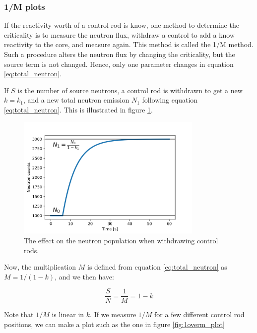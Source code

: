 \subsubsection{1/M plots}

If the reactivity worth of a control rod is know, one method to determine the criticality is to measure the neutron flux, withdraw a control to add a know reactivity to the core, and measure again. This method is called the 1/M method. Such a procedure alters the neutron flux by changing the criticality, but the source term is not changed. Hence, only one parameter changes in equation \ref{eq:total_neutron}.

If $S$ is the number of source neutrons, a control rod is withdrawn to get a new $k = k_1$, and a new total neutron emission $N_1$ following equation \ref{eq:total_neutron}. This is illustrated in figure \ref{fig:1overm}.

\begin{figure} 
\centering
\includegraphics[width=0.8\textwidth]{figures/04-1overM.png}
\caption[Area Method]{\label{fig:1overm}
The effect on the neutron population when withdrawing control rods.}
\end{figure}

Now, the multiplication $M$ is defined from equation \ref{eq:total_neutron} as $M = 1/(1-k)$, and we then have:

\begin{equation} \label{eq:1overm}
\frac{S}{N} = \frac{1}{M} =  1-k
\end{equation}

Note that $1/M$ is linear in $k$. If we measure $1/M$ for a few different control rod positions, we can make a plot such as the one in figure \ref{fig:1overm_plot}

